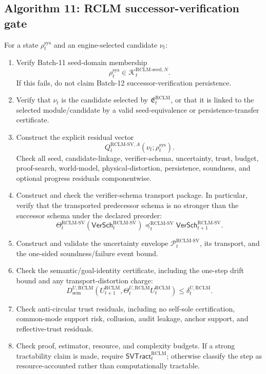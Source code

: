 \documentclass[11pt,a4paper]{article}
\newcommand{\Pcal}{\mathcal P}
\newcommand{\Kcal}{\mathcal K}
\newcommand{\RCLM}{\mathrm{RCLM}}
\newcommand{\sem}{\mathrm{sem}}
\newcommand{\sys}{\mathrm{sys}}
\begin{document}
\subsection*{Algorithm 11: RCLM successor-verification gate}
\label{alg:rclm-successor-verification-gate}
For a state \(\rho_t^{\sys}\) and an engine-selected candidate \(\nu_t\):
\begin{enumerate}[label=(\arabic*),leftmargin=1.5em]
    \item Verify Batch-11 seed-domain membership
    \[
    \rho_t^{\sys}\in\Kcal_t^{\RCLM\text{-}\mathrm{seed},N}.
    \]
    If this fails, do not claim Batch-12 successor-verification persistence.
    \item Verify that \(\nu_t\) is the candidate selected by \(\mathfrak E_t^{\RCLM}\), or that it is linked to the selected module/candidate by a valid seed-equivalence or persistence-transfer certificate.
    \item Construct the explicit residual vector
    \[
    Q_t^{\RCLM\text{-}\mathrm{SV},A}(\nu_t;\rho_t^{\sys}).
    \]
    Check all seed, candidate-linkage, verifier-schema, uncertainty, trust, budget, proof-search, world-model, physical-distortion, persistence, soundness, and optional progress residuals componentwise.
    \item Construct and check the verifier-schema transport package.  In particular, verify that the transported predecessor schema is no stronger than the successor schema under the declared preorder:
    \[
    \Theta_t^{\RCLM\text{-}\mathrm{SV}}(\mathsf{VerSch}_t^{\RCLM\text{-}\mathrm{SV}})
    \preceq_t^{\RCLM\text{-}\mathrm{SV}}
    \mathsf{VerSch}_{t+1}^{\RCLM\text{-}\mathrm{SV}}.
    \]
    \item Construct and validate the uncertainty envelope \(\Pcal_t^{\RCLM\text{-}\mathrm{SV}}\), its transport, and the one-sided soundness/failure event bound.
    \item Check the semantic/goal-identity certificate, including the one-step drift bound and any transport-distortion charge:
    \[
    D_{\sem}^{U,\RCLM}(U_{t+1}^{\RCLM},\Theta_t^{U,\RCLM}U_t^{\RCLM})
    \le \delta_t^{U,\RCLM}.
    \]
    \item Check anti-circular trust residuals, including no self-sole certification, common-mode support risk, collusion, audit leakage, anchor support, and reflective-trust residuals.
    \item Check proof, estimator, resource, and complexity budgets.  If a strong tractability claim is made, require \(\mathsf{SVTract}_t^{\RCLM}\); otherwise classify the step as resource-accounted rather than computationally tractable.

\end{enumerate}
\end{document}
